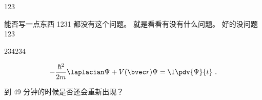 
123

能否写一点东西
1231
都没有这个问题。 就是看看有没有什么问题。 好的没问题
123

234234

\begin{equation}
-\frac{\hbar^2}{2m}\laplacian\Psi + V(\bvec r)\Psi = \I\pdv{\Psi}{t}~.
\end{equation}

到 49 分钟的时候是否还会重新出现？
